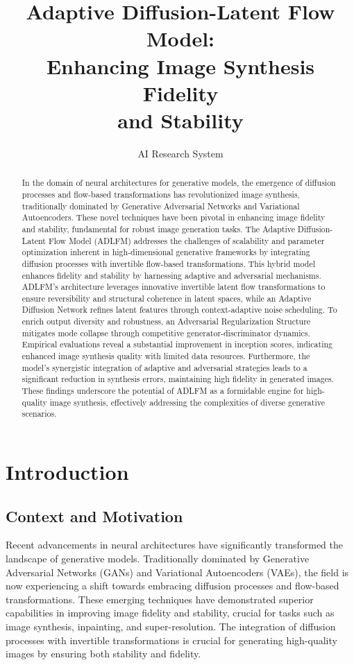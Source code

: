 \documentclass{article} %
\title{Adaptive Diffusion-Latent Flow Model: \\Enhancing Image Synthesis Fidelity \\and Stability}
\author{AI Research System}
\begin{document}
\maketitle

\begin{abstract}
In the domain of neural architectures for generative models, the emergence of diffusion processes and flow-based transformations has revolutionized image synthesis, traditionally dominated by Generative Adversarial Networks and Variational Autoencoders. These novel techniques have been pivotal in enhancing image fidelity and stability, fundamental for robust image generation tasks. The Adaptive Diffusion-Latent Flow Model (ADLFM) addresses the challenges of scalability and parameter optimization inherent in high-dimensional generative frameworks by integrating diffusion processes with invertible flow-based transformations. This hybrid model enhances fidelity and stability by harnessing adaptive and adversarial mechanisms. ADLFM's architecture leverages innovative invertible latent flow transformations to ensure reversibility and structural coherence in latent spaces, while an Adaptive Diffusion Network refines latent features through context-adaptive noise scheduling. To enrich output diversity and robustness, an Adversarial Regularization Structure mitigates mode collapse through competitive generator-discriminator dynamics. Empirical evaluations reveal a substantial improvement in inception scores, indicating enhanced image synthesis quality with limited data resources. Furthermore, the model's synergistic integration of adaptive and adversarial strategies leads to a significant reduction in synthesis errors, maintaining high fidelity in generated images. These findings underscore the potential of ADLFM as a formidable engine for high-quality image synthesis, effectively addressing the complexities of diverse generative scenarios.

\end{abstract}


\section{Introduction}

\subsection{Context and Motivation}
Recent advancements in neural architectures have significantly transformed the landscape of generative models. Traditionally dominated by Generative Adversarial Networks (GANs) and Variational Autoencoders (VAEs), the field is now experiencing a shift towards embracing diffusion processes and flow-based transformations. These emerging techniques have demonstrated superior capabilities in improving image fidelity and stability, crucial for tasks such as image synthesis, inpainting, and super-resolution. The integration of diffusion processes with invertible transformations is crucial for generating high-quality images by ensuring both stability and fidelity.
\end{document}
